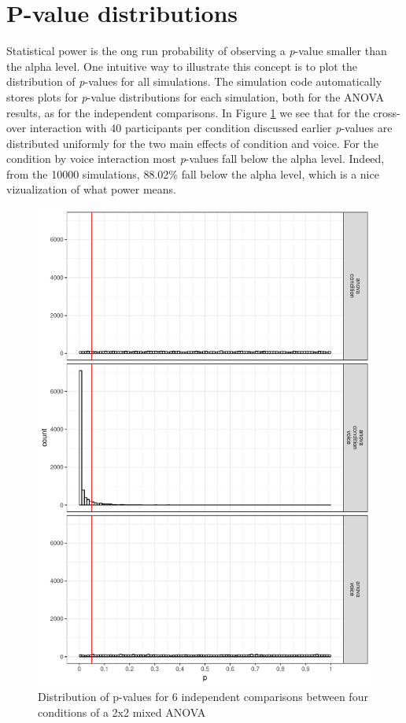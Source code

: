 \documentclass[,jou, draftfirst, a4paper,floatsintext]{apa6}
\begin{document}
\hypertarget{p-value-distributions}{%
\section{P-value distributions}\label{p-value-distributions}}

Statistical power is the ong run probability of observing a \emph{p}-value smaller than the alpha level.
One intuitive way to illustrate this concept is to plot the distribution of \emph{p}-values for all simulations.
The simulation code automatically stores plots for \emph{p}-value distributions for each simulation, both for the ANOVA results, as for the independent comparisons.
In Figure \ref{fig:p-plot} we see that for the cross-over interaction with 40 participants per condition discussed earlier \emph{p}-values are distributed uniformly for the two main effects of condition and voice.
For the condition by voice interaction most \emph{p}-values fall below the alpha level.
Indeed, from the 10000 simulations, 88.02\% fall below the alpha level, which is a nice vizualization of what power means.

\begin{figure}
\centering
\includegraphics{0.1_Simulation_Based_Power_Analysis_For_Factorial_ANOVA_Designs_files/figure-latex/p-plot-1.pdf}
\caption{\label{fig:p-plot}Distribution of p-values for 6 independent comparisons between four conditions of a 2x2 mixed ANOVA}
\end{figure}
\end{document}

